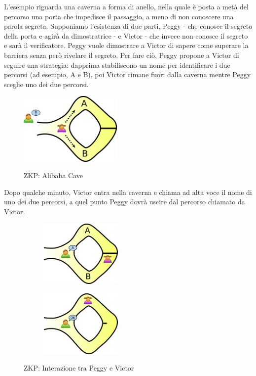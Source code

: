 L’esempio riguarda una caverna a forma di anello, nella quale è posta a metà del percorso una porta che impedisce il
passaggio, a meno di non conoscere una parola segreta. Supponiamo l'esistenza di due parti, Peggy - che
conosce il segreto della porta e agirà da dimostratrice - e Victor - che invece non conosce il segreto e sarà il
verificatore. Peggy vuole dimostrare a Victor di sapere come superare la barriera senza però rivelare il segreto. Per
fare ciò, Peggy propone a Victor di seguire una strategia: dapprima stabiliscono un nome per identificare i due percorsi
(ad esempio, A e B), poi Victor rimane fuori dalla caverna mentre Peggy sceglie uno dei due percorsi. 
\begin{figure}[H]
    \centering
    \includegraphics[width=5cm]{./chapters/1.state-of-art/images/5.1.alibaba_cave.png}
    \label{fig:alibaba-cave1}
    \captionsetup{justification=centering}
    \caption{ZKP: Alibaba Cave}
\end{figure}
Dopo qualche minuto, Victor entra nella caverna e chiama ad alta voce il nome di uno dei due percorsi, a quel punto Peggy dovrà
uscire dal percorso chiamato da Victor. 
\begin{figure}
    \centering
    \begin{subfigure}{.5\textwidth}
        \centering
        \includegraphics[width=4cm]{./chapters/1.state-of-art/images/5.2.alibaba_cave.png}
        \label{fig:alibaba-cave2}
        \captionsetup{justification=centering}
    \end{subfigure}%
    \begin{subfigure}{.5\textwidth}
        \centering
        \includegraphics[width=4cm]{./chapters/1.state-of-art/images/5.3.alibaba_cave.png}
        \label{fig:alibaba-cave3}
        \captionsetup{justification=centering}
    \end{subfigure}
    \caption{ZKP: Interazione tra Peggy e Victor}
    \label{fig:alibaba-cave2_3}
\end{figure}

